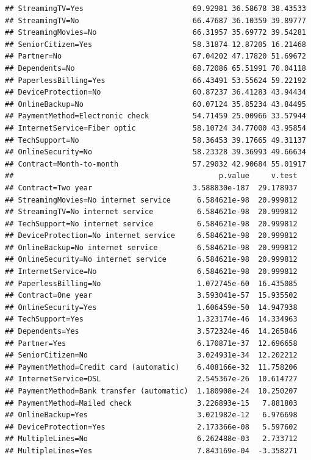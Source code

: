 \documentclass[
]{article}
\begin{document}
\begin{verbatim}
## StreamingTV=Yes                         69.92981 36.58678 38.43533
## StreamingTV=No                          66.47687 36.10359 39.89777
## StreamingMovies=No                      66.31957 35.69772 39.54281
## SeniorCitizen=Yes                       58.31874 12.87205 16.21468
## Partner=No                              67.04202 47.17820 51.69672
## Dependents=No                           68.72086 65.51991 70.04118
## PaperlessBilling=Yes                    66.43491 53.55624 59.22192
## DeviceProtection=No                     60.87237 36.41283 43.94434
## OnlineBackup=No                         60.07124 35.85234 43.84495
## PaymentMethod=Electronic check          54.71459 25.00966 33.57944
## InternetService=Fiber optic             58.10724 34.77000 43.95854
## TechSupport=No                          58.36453 39.17665 49.31137
## OnlineSecurity=No                       58.23328 39.36993 49.66634
## Contract=Month-to-month                 57.29032 42.90684 55.01917
##                                               p.value     v.test
## Contract=Two year                       3.588830e-187  29.178937
## StreamingMovies=No internet service      6.584621e-98  20.999812
## StreamingTV=No internet service          6.584621e-98  20.999812
## TechSupport=No internet service          6.584621e-98  20.999812
## DeviceProtection=No internet service     6.584621e-98  20.999812
## OnlineBackup=No internet service         6.584621e-98  20.999812
## OnlineSecurity=No internet service       6.584621e-98  20.999812
## InternetService=No                       6.584621e-98  20.999812
## PaperlessBilling=No                      1.072745e-60  16.435085
## Contract=One year                        3.593041e-57  15.935502
## OnlineSecurity=Yes                       1.606459e-50  14.947938
## TechSupport=Yes                          1.323174e-46  14.334963
## Dependents=Yes                           3.572324e-46  14.265846
## Partner=Yes                              6.170871e-37  12.696658
## SeniorCitizen=No                         3.024931e-34  12.202212
## PaymentMethod=Credit card (automatic)    6.408166e-32  11.758206
## InternetService=DSL                      2.545367e-26  10.614727
## PaymentMethod=Bank transfer (automatic)  1.180908e-24  10.250207
## PaymentMethod=Mailed check               3.226893e-15   7.881803
## OnlineBackup=Yes                         3.021982e-12   6.976698
## DeviceProtection=Yes                     2.173366e-08   5.597602
## MultipleLines=No                         6.262488e-03   2.733712
## MultipleLines=Yes                        7.843169e-04  -3.358271

\end{verbatim}
\end{document}
